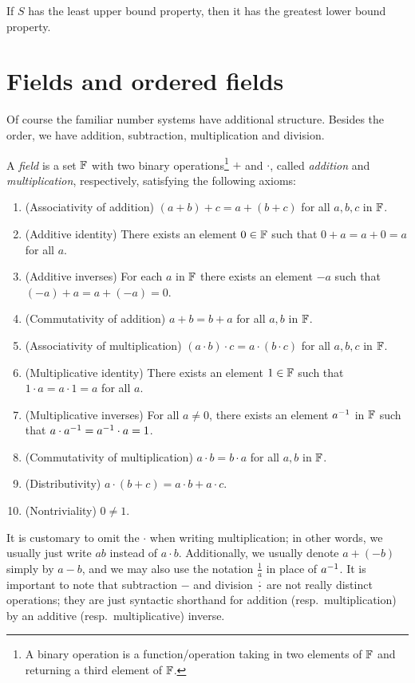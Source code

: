 \documentclass{book}
\begin{document}
\begin{thm}
If $S$ has the least upper bound property, then it has the greatest lower bound property.
\label{T:lub_implies_glb}
\end{thm}


\section{Fields and ordered fields} \label{S:fields}
Of course the familiar number systems have additional structure. Besides the order, we have 
addition, subtraction, multiplication and division.

\begin{defn}
A {\em field} is a set $\mathbb{F}$ with two binary operations\footnote{A binary operation is a function/operation taking in two elements of $\mathbb{F}$ and returning
a third element of $\mathbb{F}$.} 
$+$ and $\cdot$,
called {\em addition} and {\em multiplication}, respectively, satisfying the following axioms:
\begin{enumerate}
\item (Associativity of addition) $(a + b) + c = a + (b + c)$ for all $a,b,c$ in $\mathbb{F}$.
\label{I:field_ass_add}
\item (Additive identity) There exists an element $0 \in \mathbb{F}$ such that $0 + a = a + 0 = a$ for all $a$.
\label{I:field_add_id}
\item (Additive inverses) For each $a$ in $\mathbb{F}$ there exists an element $-a$ such that $(-a) + a = a + (-a) = 0$. 
\label{I:field_add_inv}
\item (Commutativity of addition) $a + b = b + a$ for all $a,b$ in $\mathbb{F}$.
\label{I:field_comm_add}
\item (Associativity of multiplication) $(a \cdot b) \cdot c = a \cdot (b \cdot c)$ for all $a,b,c$ in $\mathbb{F}$.
\label{I:field_ass_mul}
\item (Multiplicative identity) There exists an element $1 \in \mathbb{F}$ such that $1 \cdot a = a \cdot 1 = a$ for all $a$.
\label{I:field_mul_id}
\item (Multiplicative inverses) For all $a \neq 0$, there exists an element $a^{-1}$ in $\mathbb{F}$ such that $a\cdot a^{-1} = a^{-1} \cdot a = 1$.
\label{I:field_mul_inv}
\item (Commutativity of multiplication) $a\cdot b = b \cdot a$ for all $a,b$ in $\mathbb{F}$.
\label{I:field_comm_mul}
\item (Distributivity) $a\cdot (b + c) = a\cdot b + a \cdot c$.
\label{I:field_dist}
\item (Nontriviality) $0 \neq 1$. 
\label{I:field_nondegen}
\end{enumerate}
It is customary to omit the $\cdot$ when writing multiplication; in other words, we usually just write $ab$ instead of $a\cdot b$. Additionally,
we usually denote $a + (-b)$ simply by $a - b$,
and we may also use the notation $\frac 1 a$ in place of $a^{-1}$.
It is important to note that subtraction $-$ and division $\frac \cdot \cdot$ are not really distinct operations; they are just syntactic shorthand for addition (resp.\ multiplication) by an additive (resp.\ multiplicative) inverse. 


\end{defn}
\end{document}
